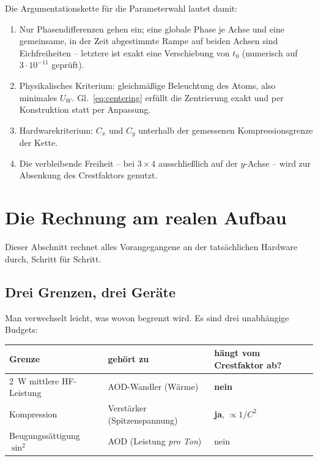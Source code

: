 \documentclass[11pt,a4paper]{article}
\newcommand{\crest}{\ensuremath{C}}
\newcommand{\Uw}{\ensuremath{U_W}}
\begin{document}
Die Argumentationskette für die Parameterwahl lautet damit:
\begin{enumerate}\itemsep0.2em
  \item Nur Phasendifferenzen gehen ein; eine globale Phase je Achse und eine
        gemeinsame, in der Zeit abgestimmte Rampe auf beiden Achsen sind
        Eichfreiheiten -- letztere ist exakt eine Verschiebung von $t_0$
        (numerisch auf $3\cdot10^{-11}$ geprüft).
  \item Physikalisches Kriterium: gleichmäßige Beleuchtung des Atoms, also
        minimales $\Uw$. Gl.~\eqref{eq:centering} erfüllt die Zentrierung
        exakt und per Konstruktion statt per Anpassung.
  \item Hardwarekriterium: $\crest_x$ und $\crest_y$ unterhalb der
        gemessenen Kompressionsgrenze der Kette.
  \item Die verbleibende Freiheit -- bei $3\times4$ ausschließlich auf der
        $y$-Achse -- wird zur Absenkung des Crestfaktors genutzt.
\end{enumerate}

\section{Die Rechnung am realen Aufbau}\label{sec:realsetup}

Dieser Abschnitt rechnet alles Vorangegangene an der tatsächlichen Hardware
durch, Schritt für Schritt.

\subsection{Drei Grenzen, drei Geräte}

Man verwechselt leicht, was wovon begrenzt wird. Es sind drei unabhängige
Budgets:

\begin{center}
\begin{tabular}{lll}
  \toprule
  Grenze & gehört zu & hängt vom Crestfaktor ab?\\
  \midrule
  \SI{2}{\watt} mittlere HF-Leistung & AOD-Wandler (Wärme) & \textbf{nein}\\
  Kompression & Verstärker (Spitzenspannung) & \textbf{ja}, $\propto 1/\crest^2$\\
  Beugungssättigung $\sin^2$ & AOD (Leistung \emph{pro Ton}) & nein\\
  \bottomrule
\end{tabular}
\end{center}
\end{document}

